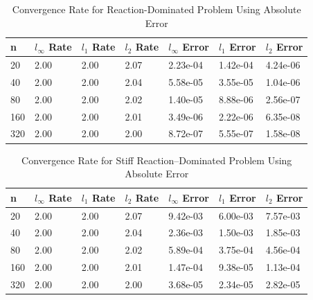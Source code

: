 \begin{table}[h]
   \caption{\label{tab:diffusion_spatial_convergence_reaction_dom} Convergence Rate for Reaction-Dominated Problem Using Absolute Error}
   \centering
   \begin{tabular}{lllllll}
   \hline
    n & $l_{\infty}$ Rate & $l_{1}$ Rate & $l_{2}$ Rate &$l_{\infty}$ Error &$l_{1}$ Error & $l_{2}$ Error\\
   \hline
   20 & 2.00 & 2.00 & 2.07 & 2.23e-04 & 1.42e-04 & 4.24e-06 \\
   40 & 2.00 & 2.00 & 2.04 & 5.58e-05 & 3.55e-05 & 1.04e-06 \\
   80 & 2.00 & 2.00 & 2.02 & 1.40e-05 & 8.88e-06 & 2.56e-07 \\
   160 & 2.00 & 2.00 & 2.01 & 3.49e-06 & 2.22e-06 & 6.35e-08 \\
   320 & 2.00 & 2.00 & 2.00 & 8.72e-07 & 5.55e-07 & 1.58e-08 \\
   \hline
   \end{tabular}
\end{table}

\begin{table}[h]
   \caption{\label{tab:diffusion_spatial_convergence_stiff_reaction_dom} Convergence Rate for Stiff Reaction--Dominated Problem Using Absolute Error}
   \centering
   \begin{tabular}{lllllll}
   \hline
    n & $l_{\infty}$ Rate & $l_{1}$ Rate & $l_{2}$ Rate &$l_{\infty}$ Error &$l_{1}$ Error & $l_{2}$ Error\\
   \hline
  20 & 2.00 & 2.00 & 2.07 & 9.42e-03 & 6.00e-03 & 7.57e-03 \\ 
  40 & 2.00 & 2.00 & 2.04 & 2.36e-03 & 1.50e-03 & 1.85e-03 \\ 
  80 & 2.00 & 2.00 & 2.02 & 5.89e-04 & 3.75e-04 & 4.56e-04 \\ 
  160 & 2.00 & 2.00 & 2.01 & 1.47e-04 & 9.38e-05 & 1.13e-04 \\ 
  320 & 2.00 & 2.00 & 2.00 & 3.68e-05 & 2.34e-05 & 2.82e-05 \\
   \hline
   \end{tabular}
\end{table}

\clearpage

